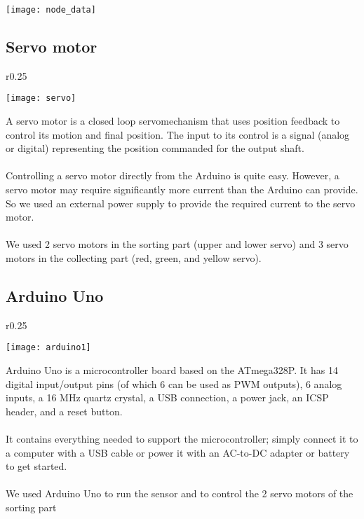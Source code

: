 \begin{center}
    
    \texttt{[image: node\_data]}
    \end{center}

\subsection{Servo motor}

\begin{wrapfigure}{r}{0.25\textwidth}
    \begin{center}
      \texttt{[image: servo]}
    \end{center}
  \end{wrapfigure}

A servo motor is a closed loop servomechanism that uses position feedback to
control its motion and final position. The input to its control is a signal
(analog or digital) representing the position commanded for the output shaft.\\\\
Controlling a servo motor directly from the Arduino is quite easy. However,
a servo motor may require significantly more current than the Arduino can
provide. So we used an external power supply to provide the required current
to the servo motor.\\\\
We used 2 servo motors in the sorting part (upper and lower servo) and 3
servo motors in the collecting part (red, green, and yellow servo).

\subsection{Arduino Uno}

\begin{wrapfigure}{r}{0.25\textwidth}
    \begin{center}
      \texttt{[image: arduino1]}
    \end{center}
  \end{wrapfigure}

  Arduino Uno is a microcontroller board based on the
  ATmega328P. It has 14 digital input/output pins (of which 6
  can be used as PWM outputs), 6 analog inputs, a 16 MHz
  quartz crystal, a USB connection, a power jack, an ICSP
  header, and a reset button.\\\\
  It contains everything needed to support the microcontroller;
  simply connect it to a computer with a USB cable or power it
  with an AC-to-DC adapter or battery to get started.\\\\
  We used Arduino Uno to run the sensor and to control the 2
  servo motors of the sorting part\\


